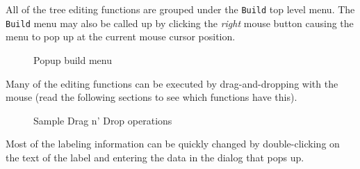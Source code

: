 All of the tree editing functions are grouped under the {\tt Build} top
level menu.  The {\tt Build} menu may also be called up by clicking the
{\em right} mouse button causing the menu to pop up at
the current mouse cursor position.
\begin{figure}
\caption{Popup build menu}
\end{figure}

Many of the editing functions can be executed
by drag-and-dropping with the mouse (read the following sections to see
which functions have this).
\begin{figure}
\caption{Sample Drag n' Drop operations}
\end{figure}

Most of the labeling information can be
quickly changed by double-clicking on the text of the label and entering
the data in the dialog that pops up.

